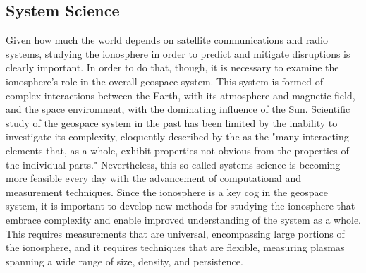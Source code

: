 \subsection{System Science}
\label{intro_system_science}
Given how much the world depends on satellite communications and radio systems, studying the ionosphere in order to predict and mitigate disruptions is clearly important. In order to do that, though, it is necessary to examine the ionosphere's role in the overall geospace system. This system is formed of complex interactions between the Earth, with its atmosphere and magnetic field, and the space environment, with the dominating influence of the Sun. Scientific study of the geospace system in the past has been limited by the inability to investigate its complexity, eloquently described by the \textcite{CEDAR11} as the "many interacting elements that, as a whole, exhibit properties not obvious from the properties of the individual parts." Nevertheless, this so-called systems science is becoming more feasible every day with the advancement of computational and measurement techniques. Since the ionosphere is a key cog in the geospace system, it is important to develop new methods for studying the ionosphere that embrace complexity and enable improved understanding of the system as a whole. This requires measurements that are universal, encompassing large portions of the ionosphere, and it requires techniques that are flexible, measuring plasmas spanning a wide range of size, density, and persistence.

